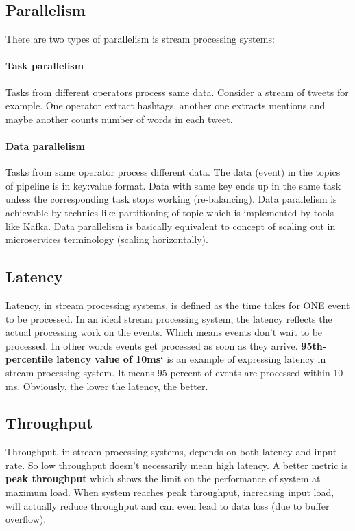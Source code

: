 \documentclass[a4]{report}
\begin{document}
    \subsection{Parallelism}
    There are two types of parallelism is stream processing systems:

    \paragraph{Task parallelism}
    Tasks from different operators process same data.
    Consider a stream of tweets for example.
    One operator extract hashtags, another one extracts mentions and maybe another counts number of words in each
    tweet.

    \paragraph{Data parallelism}
    Tasks from same operator process different data.
    The data (event) in the topics of pipeline is in key:value format.
    Data with same key ends up in the same task unless the corresponding task stops working (re-balancing).
    Data parallelism is achievable by technics like partitioning of topic which is implemented by tools like Kafka.
    Data parallelism is basically equivalent to concept of scaling out in microservices terminology (scaling
    horizontally).

    \subsection{Latency}
    Latency, in stream processing systems, is defined as the time takes for ONE event to be processed.
    In an ideal stream processing system, the latency reflects the actual processing work on the events.
    Which means events don't wait to be processed.
    In other words events get processed as soon as they arrive.
    \textbf{95th-percentile latency value of 10ms`} is an example of expressing latency in stream processing system.
    It means 95 percent of events are processed within 10 ms.
    Obviously, the lower the latency, the better.

    \subsection{Throughput}
    Throughput, in stream processing systems, depends on both latency and input rate.
    So low throughput doesn't necessarily mean high latency.
    A better metric is \textbf{peak throughput} which shows the limit on the performance of system at maximum load.
    When system reaches peak throughput, increasing input load, will actually reduce throughput and can even lead to
    data loss (due to buffer overflow).
\end{document}
